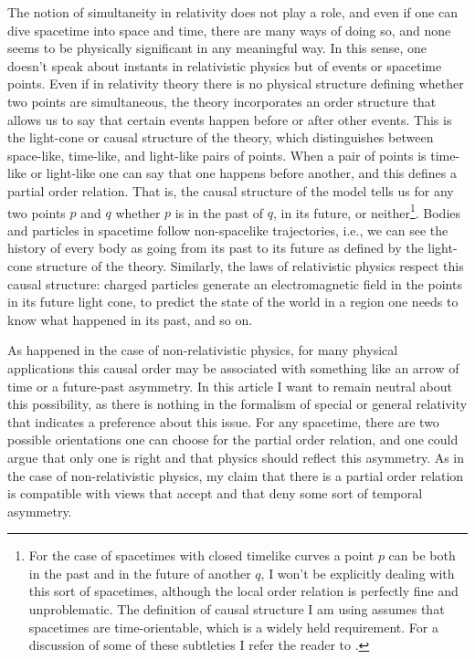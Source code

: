 \documentclass[12 pt]{article}
\begin{document}
The notion of simultaneity in relativity does not play a role, and even if one can dive spacetime into space and time, there are many ways of doing so, and none seems to be physically significant in any meaningful way. In this sense, one doesn't speak about instants in relativistic physics but of events or spacetime points. Even if in relativity theory there is no physical structure defining whether two points are simultaneous, the theory incorporates an order structure that allows us to say that certain events happen before or after other events. This is the light-cone or causal structure of the theory, which distinguishes between space-like, time-like, and light-like pairs of points. When a pair of points is time-like or light-like one can say that one happens before another, and this defines a partial order relation. That is, the causal structure of the model tells us for any two points $p$ and $q$ whether $p$ is in the past of $q$, in its future, or neither\footnote{For the case of spacetimes with closed timelike curves a point $p$ can be both in the past and in the future of another $q$, I won't be explicitly dealing with this sort of spacetimes, although the local order relation is perfectly fine and unproblematic. The definition of causal structure I am using assumes that spacetimes are time-orientable, which is a widely held requirement. For a discussion of some of these subtleties I refer the reader to \citep{Manchak2011}.}. Bodies and particles in spacetime follow non-spacelike trajectories, i.e., we can see the history of every body as going from its past to its future as defined by the light-cone structure of the theory. Similarly, the laws of relativistic physics respect this causal structure: charged particles generate an electromagnetic field in the points in its future light cone, to predict the state of the world in a region one needs to know what happened in its past, and so on. 

As happened in the case of non-relativistic physics, for many physical applications this causal order may be associated with something like an arrow of time or a future-past asymmetry. In this article I want to remain neutral about this possibility, as there is nothing in the formalism of special or general relativity that indicates a preference about this issue. For any spacetime, there are two possible orientations one can choose for the partial order relation, and one could argue that only one is right and that physics should reflect this asymmetry. As in the case of non-relativistic physics, my claim that there is a partial order relation is compatible with views that accept and that deny some sort of temporal asymmetry.
\end{document}
